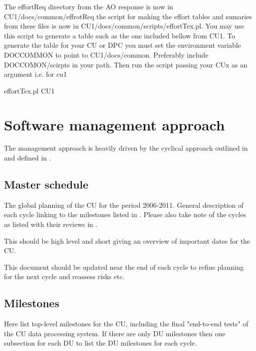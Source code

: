 \documentclass[CUx,lsstdraft,SDP]{lsstdoc}
\begin{document}
The effortReq directory from the AO response is now in CU1/docs/common/effrotReq
the script for making the effort tables and sumaries from these files is now
in CU1/docs/common/scripts/effortTex.pl. You may use this script to generate a
table such as the one included bellow from CU1. To generate the table for your
CU or DPC you must set the environment variable DOCCOMMON to point to
CU1/docs/common. Preferably include DOCCOMON/scirpts in your path. Then run the script
passing your CUx as an argument i.e. for cu1
\begin{code}
effortTex.pl CU1
\end{code}



\section{Software management approach} \label{sect:managemntapp}
The management approach is heavily driven by the cyclical approach outlined
in  and defined in .

\subsection{Master schedule } \label{sect:mastschedule}

The global planning of the CU for the period 2006-2011.
General description of each cycle linking to the  milestones
listed in .  Please also take note of the cycles
as listed with their reviews in .

This should be high level and short giving an overview of important dates for the CU.

This document should be updated near the end of each cycle to
refine planning for the next cycle and reassess risks etc.

\subsection{Milestones}
Here list top-level milestones for the CU, including the final "end-to-end tests" of the CU data processing system. If there are only DU milestones then
one subsection for each DU to list the DU milestones for each cycle.
\end{document}
